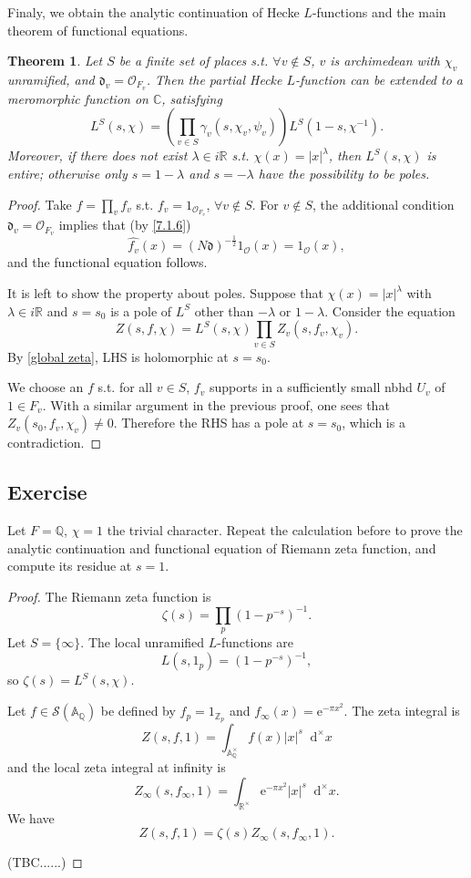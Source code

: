 \documentclass{article}
\newtheorem{theorem}{Theorem}
\theoremstyle{definition}
\theoremstyle{remark}
\renewcommand{\hat}{\widehat}
\newcommand{\R}{\mathbb{R}}
\newcommand{\C}{\mathbb{C}}
\newcommand{\Q}{\mathbb{Q}}
\newcommand{\Z}{\mathbb{Z}}
\newcommand{\adele}[1]{\mathbb{A}_{#1}}
\newcommand{\idele}[1]{\mathbb{A}_{#1}^{\times}}
\newcommand{\dxm}{\mathop{}\!\mathrm{d}^{\times}x}
\newcommand{\diff}{\mathfrak{d}}
\renewcommand{\O}{\mathcal{O}}
\newcommand{\e}{\mathrm{e}}
\begin{document}
Finaly, we obtain the analytic continuation of Hecke $L$-functions and the main theorem of functional equations.
\begin{theorem}
    Let $S$ be a finite set of places s.t. $\forall v\notin S$, $v$ is archimedean with $\chi_v$ unramified, and $\diff_v = \O_{F_v}$.
    Then the partial Hecke $L$-function can be extended to a meromorphic function on $\C$, satisfying \[L^S(s,\chi) = \left( \prod_{v\in S}\gamma_v(s, \chi_v, \psi_v) \right)L^S(1-s, \chi^{-1}).\]
    Moreover, if there does not exist $\lambda\in i\R$ s.t. $\chi(x) = |x|^\lambda$, then $L^S(s, \chi)$ is entire; otherwise only $s = 1-\lambda$ and $s = -\lambda$ have the possibility to be poles.
\end{theorem}
\begin{proof}
    Take $f = \prod_v f_v$ s.t. $f_v = 1_{\O_{F_v}}$, $\forall v\notin S$.
    For $v\notin S$, the additional condition $\diff_v = \O_{F_v}$ implies that (by \cref{7.1.6}) \[\hat{f_v}(x) = (N\diff)^{-\frac{1}{2}}1_{\O}(x) = 1_\O(x),\] and the functional equation follows.

    It is left to show the property about poles. Suppose that $\chi(x) = |x|^\lambda$ with $\lambda\in i\R$ and $s = s_0$ is a pole of $L^S$ other than $-\lambda$ or $1-\lambda$.
    Consider the equation \[Z(s,f,\chi)=L^S(s,\chi)\prod_{v\in S}Z_v(s, f_v,\chi_v).\]
    By \cref{global zeta}, LHS is holomorphic at $s = s_0$.

    We choose an $f$ s.t. for all $v\in S$, $f_v$ supports in a sufficiently small nbhd $U_v$ of $1\in F_v$.
    With a similar argument in the previous proof, one sees that $Z_v(s_0, f_v, \chi_v) \ne 0$. Therefore the RHS has a pole at $s = s_0$, which is a contradiction. 

\end{proof}

\subsection{Exercise}
Let $F = \Q$, $\chi = 1$ the trivial character. Repeat the calculation before to prove the analytic continuation and functional equation of Riemann zeta function, and compute its residue at $s = 1$.
\begin{proof}
    The Riemann zeta function is \[\zeta(s) = \prod_p (1-p^{-s})^{-1}.\]
    Let $S = \{\infty\}$. The local unramified $L$-functions are \[L(s, 1_p) = (1- p^{-s})^{-1},\] so $\zeta(s) = L^S(s, \chi)$.
    
    Let $f\in\mathcal{S}(\adele{\Q})$ be defined by $f_p = 1_{\Z_p}$ and $f_\infty(x) = \e^{-\pi x^2}$.
    The zeta integral is \[Z(s, f, 1) = \int_{\idele{\Q}} f(x)|x|^s\dxm\]
    and the local zeta integral at infinity is \[Z_\infty(s, f_\infty, 1) = \int_{\R^\times}\e^{-\pi x^2}|x|^s \dxm.\]
    We have \[Z(s, f, 1) = \zeta(s)Z_\infty(s, f_\infty, 1).\]

    (TBC......)
\end{proof}
\end{document}
